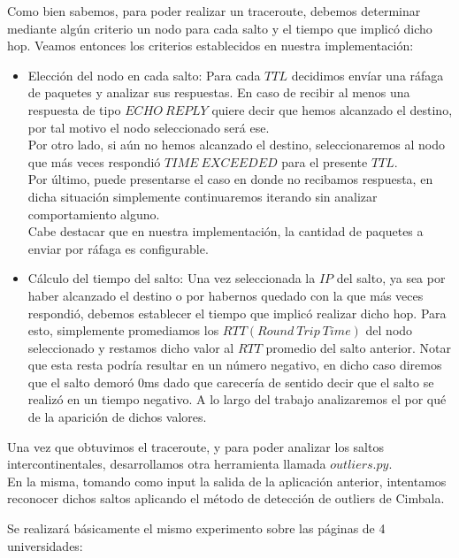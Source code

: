 Como bien sabemos, para poder realizar un traceroute, debemos determinar mediante algún criterio un nodo para cada salto y el tiempo que implicó dicho hop.
Veamos entonces los criterios establecidos en nuestra implementación:
\begin{itemize}
	\item Elección del nodo en cada salto: Para cada $TTL$ decidimos envíar una ráfaga de paquetes y analizar sus respuestas. En caso de recibir al menos una respuesta de tipo $ECHO\ REPLY$ quiere decir que hemos alcanzado el destino, por tal motivo el nodo seleccionado será ese. \\
Por otro lado, si aún no hemos alcanzado el destino, seleccionaremos al nodo que más veces respondió $TIME\ EXCEEDED$ para el presente $TTL$.\\
Por último, puede presentarse el caso en donde no recibamos respuesta, en dicha situación simplemente continuaremos iterando sin analizar comportamiento alguno. \\
Cabe destacar que en nuestra implementación, la cantidad de paquetes a enviar por ráfaga es configurable.
	\item Cálculo del tiempo del salto: Una vez seleccionada la $IP$ del salto, ya sea por haber alcanzado el destino o por habernos quedado con la que más veces respondió, debemos establecer el tiempo que implicó realizar dicho hop. Para esto, simplemente promediamos los $RTT (Round\ Trip\ Time)$ del nodo seleccionado y restamos dicho valor al $RTT$ promedio del salto anterior. Notar que esta resta podría resultar en un número negativo, en dicho caso diremos que el salto demoró 0ms dado que carecería de sentido decir que el salto se realizó en un tiempo negativo. A lo largo del trabajo analizaremos el por qué de la aparición de dichos valores.
\end{itemize}


Una vez que obtuvimos el traceroute, y para poder analizar los saltos intercontinentales, desarrollamos otra herramienta llamada $outliers.py$. \\
En la misma, tomando como input la salida de la aplicación anterior, intentamos reconocer dichos saltos aplicando el método de detección de outliers de Cimbala. 

\newpage


Se realizará básicamente el mismo experimento sobre las páginas de 4 universidades:

